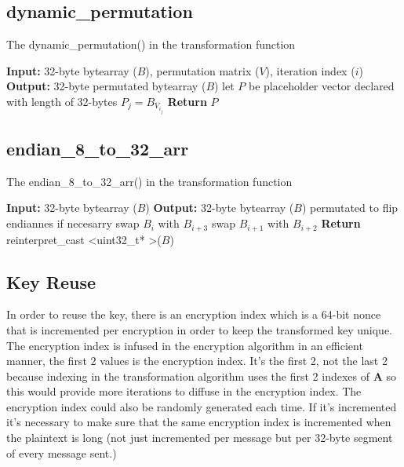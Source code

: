 \documentclass[fleqn, a4paper,12pt]{article}
\begin{document}
\subsection{dynamic\_permutation} \label{dynamic_permutation}

\begin{algorithm}[H] %
\caption{The dynamic\_permutation() in the transformation function}
\begin{algorithmic}[1]  %
\State \textbf{Input:} 32-byte bytearray ($B$), permutation matrix ($V$), iteration index ($i$)
\State \textbf{Output:} 32-byte permutated bytearray ($B$)
\State let $P$ be placeholder vector declared with length of 32-bytes
		\State $P_j = B_{V_{i_j}}$
\EndFor
\State \textbf{Return} $P$
\end{algorithmic}
\end{algorithm}

\subsection{endian\_8\_to\_32\_arr} \label{dynamic_permutation}

\begin{algorithm}[H] %
\caption{The endian\_8\_to\_32\_arr() in the transformation function}
\begin{algorithmic}[1]  %
\State \textbf{Input:} 32-byte bytearray ($B$)
\State \textbf{Output:} 32-byte bytearray ($B$) permutated to flip endiannes if necesarry
		\State swap $B_i$ with $B_{i+3}$
		\State swap $B_{i+1}$ with $B_{i+2}$
	\EndFor
\EndIf
\State \textbf{Return} reinterpret\_cast \textless uint32\_t* \textgreater ($B$)
\end{algorithmic}
\end{algorithm}

\subsection {Key Reuse}

In order to reuse the key, there is an encryption index which is a 64-bit nonce that is incremented per encryption in order to keep the transformed key unique. The encryption index is infused in the encryption algorithm in an efficient manner, the first 2 values is the encryption index. It's the first 2, not the last 2 because indexing in the transformation algorithm uses the first 2 indexes of \textbf{A} so this would provide more iterations to diffuse in the encryption index. The encryption index could also be randomly generated each time. If it's incremented it's necessary to make sure that the same encryption index is incremented when the plaintext is long (not just incremented per message but per 32-byte segment of every message sent.)
\end{document}
